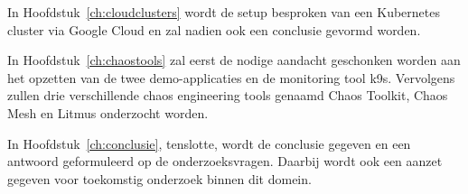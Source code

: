 In Hoofdstuk~\ref{ch:cloudclusters} wordt de setup besproken van een Kubernetes cluster via Google Cloud en zal nadien ook een conclusie gevormd worden.

In Hoofdstuk~\ref{ch:chaostools} zal eerst de nodige aandacht geschonken worden aan het opzetten van de twee demo-applicaties en de monitoring tool k9s. Vervolgens zullen drie verschillende chaos engineering tools genaamd Chaos Toolkit, Chaos Mesh en Litmus onderzocht worden. 

In Hoofdstuk~\ref{ch:conclusie}, tenslotte, wordt de conclusie gegeven en een antwoord geformuleerd op de onderzoeksvragen. Daarbij wordt ook een aanzet gegeven voor toekomstig onderzoek binnen dit domein.